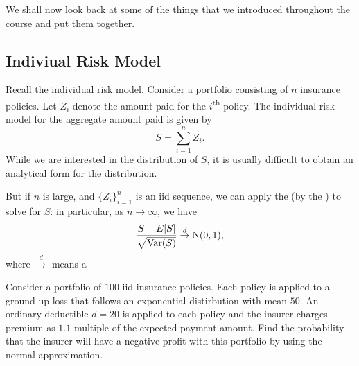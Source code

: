 \documentclass[notoc,notitlepage]{tufte-book}
\begin{document}

We shall now look back at some of the things that we introduced throughout the course and put them together.

\subsection{Indiviual Risk Model}%
\label{sub:indiviual_risk_model}

Recall the \hyperref[defn:individual_risk_model]{individual risk model}. Consider a portfolio consisting of $n$ insurance policies. Let $Z_i$  denote the amount paid for the $i$\textsuperscript{th} policy. The individual risk model for the aggregate amount paid is given by
\begin{equation*}
  S = \sum_{i=1}^{n} Z_i.
\end{equation*}
While we are interested in the distribution of $S$, it is usually difficult to obtain an analytical form for the distribution. 

But if $n$ is large, and $\{ Z_i \}_{i = 1}^{n}$ is an iid sequence, we can apply the  (by the ) to solve for $S$: in particular, as $n \to \infty$, we have
\begin{equation*}
  \frac{S - E [ S ]}{\sqrt{ \operatorname{Var}(S) }} \overset{d}{\to} \operatorname{N}(0, 1),
\end{equation*}
where $\overset{d}{\to}$ means a 

\begin{eg}
  Consider a portfolio of $100$ iid insurance policies. Each policy is applied to a ground-up loss that follows an exponential distirbution with mean $50$. An ordinary deductible $d = 20$ is applied to each policy and the insurer charges premium as $1.1$ multiple of the expected payment amount. Find the probability that the insurer will have a negative profit with this portfolio by using the normal approximation.
\end{eg}
\end{document}
